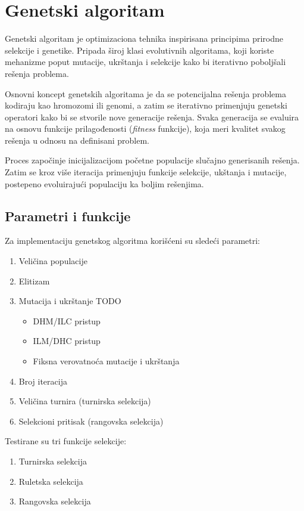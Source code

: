 \documentclass[12pt, a4paper]{article}
\begin{document}
\section{Genetski algoritam}
Genetski algoritam je optimizaciona tehnika inspirisana principima prirodne selekcije i genetike. Pripada široj klasi evolutivnih algoritama, koji koriste mehanizme poput mutacije, ukrštanja i selekcije kako bi iterativno poboljšali rešenja problema.

Osnovni koncept genetskih algoritama je da se potencijalna rešenja problema kodiraju kao hromozomi ili genomi, a zatim se iterativno primenjuju genetski operatori kako bi se stvorile nove generacije rešenja. Svaka generacija se evaluira na osnovu funkcije prilagođenosti (\textit{fitness} funkcije), koja meri kvalitet svakog rešenja u odnosu na definisani problem.

Proces započinje inicijalizacijom početne populacije slučajno generisanih rešenja. Zatim se kroz više iteracija primenjuju funkcije selekcije, ukštanja i mutacije, postepeno evoluirajući populaciju ka boljim rešenjima.

\subsection{Parametri i funkcije}
Za implementaciju genetskog algoritma korišćeni su sledeći parametri:
\begin{enumerate}
	\item Veličina populacije
	\item Elitizam
	\item Mutacija i ukrštanje TODO
		\begin{itemize}
			\item DHM/ILC pristup 
			\item ILM/DHC pristup
			\item Fiksna verovatnoća mutacije i ukrštanja
		\end{itemize}
	\item Broj iteracija
	\item Veličina turnira (turnirska selekcija)
	\item Selekcioni pritisak (rangovska selekcija) \\
\end{enumerate}

Testirane su tri funkcije selekcije:
\begin{enumerate}
	\item Turnirska selekcija
	\item Ruletska selekcija
	\item Rangovska selekcija \\
\end{enumerate}
\end{document}
